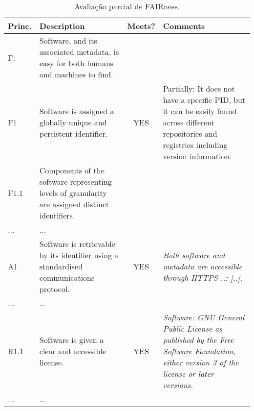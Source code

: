 
\begin{table}[tbp]
    \caption{Avaliação parcial de FAIRness.}
    \centering
    \small
    \begin{tabular}{p{0.9cm}|p{5cm}|c|p{6cm}}
    \hline
    Princ. & Description & Meets? & Comments 
    \\ \hline
    F: & Software, and its associated metadata, is easy for both humans and machines to find. & & \\
     F1 & Software is assigned a globally unique and persistent identifier. & YES & Partially: It does not have a specific PID, but it can be easily found across different repositories and registries including version information. \\
     F1.1 & Components of the software representing levels of granularity are assigned distinct identifiers. & & \\
     ... & ... & & \\
     A1 & Software is retrievable by its identifier using a standardised communications protocol. & YES & \textit{Both software and metadata are accessible through HTTPS ..: [..].} \\
     ... & ... & & \\
     R1.1 & Software is given a clear and accessible license. & YES & 
     \textit{Software: GNU General Public License as published by the Free Software Foundation, either version 3 of the license or later versions.} \\
     ... & ... & & \\
      \hline
    \end{tabular} \label{tab:fairness:parcial}
\end{table}